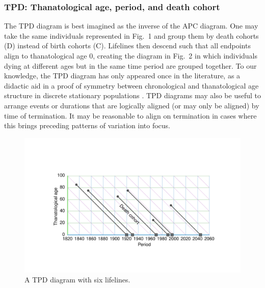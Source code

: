 \documentclass{bmcart}
\theoremstyle{definition}
\begin{document}
\FloatBarrier
\subsubsection{TPD: Thanatological age, period, and death cohort}
\label{sec:tpd}
The TPD diagram is best imagined as the inverse of the APC diagram. One may take
the same individuals represented in Fig.~1 and group them by death cohorts (D) instead
of birth cohorts (C). Lifelines then descend such that all
endpoints align to thanatological age 0, creating the diagram in
Fig.~2 in which individuals dying at different ages but in the same time period are grouped together.
To our knowledge, the TPD diagram has only appeared once in the literature, as
a didactic aid in a proof of symmetry between chronological and thanatological
age structure in discrete stationary populations \citep{villavicencioRiffeSymmetires2016}. TPD
diagrams may also be useful to arrange events or durations that are logically
aligned (or may only be aligned) by time of termination. It may be reasonable to
align on termination in cases where this brings preceding patterns of
variation into focus.

\begin{figure}[h!] 
\caption{A TPD diagram with six lifelines.}
\label{fig:TPD}
\centering
\includegraphics[scale=0.8]{Fig2.pdf}
\end{figure} 
\end{document}
